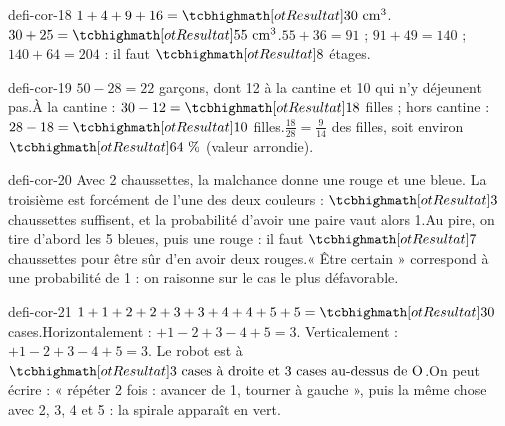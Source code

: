 \begin{blocEdition}{defi-cor-18}
$1+4+9+16=\res{30\ \mathrm{cm}^3}$.$30+25=\res{55\ \mathrm{cm}^3}$.$55+36=91$ ; $91+49=140$ ; $140+64=204$ : il faut $\res8$ étages.\label{fig-defi-cor-18}

\end{blocEdition}
\begin{blocEdition}{defi-cor-19}
$50-28=22$ garçons, dont 12 à la cantine et 10 qui n’y déjeunent pas.À la cantine : $30-12=\res{18}$ filles ; hors cantine : $28-18=\res{10}$ filles.$\frac{18}{28}=\frac9{14}$ des filles, soit environ $\res{64\text{~\%}}$ (valeur arrondie).
\end{blocEdition}
\begin{blocEdition}{defi-cor-20}
Avec 2 chaussettes, la malchance donne une rouge et une bleue. La troisième est forcément de l’une des deux couleurs : $\res3$ chaussettes suffisent, et la probabilité d’avoir une paire vaut alors 1.Au pire, on tire d’abord les 5 bleues, puis une rouge : il faut $\res7$ chaussettes pour être sûr d’en avoir deux rouges.« Être certain » correspond à une probabilité de 1 : on raisonne sur le cas le plus défavorable.
\end{blocEdition}
\begin{blocEdition}{defi-cor-21}
$1+1+2+2+3+3+4+4+5+5=\res{30}$ cases.Horizontalement : $+1-2+3-4+5=3$. Verticalement : $+1-2+3-4+5=3$. Le robot est à $\res{\text{3 cases à droite et 3 cases au-dessus de O}}$.On peut écrire : « répéter 2 fois : avancer de 1, tourner à gauche », puis la même chose avec 2, 3, 4 et 5 : la spirale apparaît en vert.\label{fig-defi-cor-21}

\end{blocEdition}
